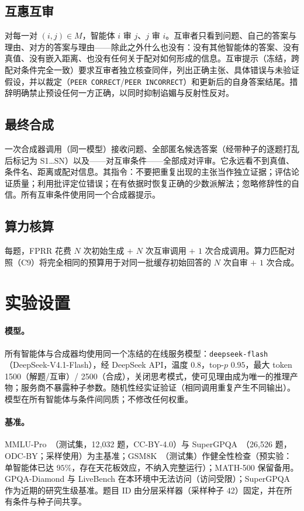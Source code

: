 \documentclass[UTF8,11pt]{ctexart}
\begin{document}
\subsection{互惠互审}
对每一对 $(i,j) \in M$，智能体 $i$ 审 $j$、$j$ 审 $i$。互审者只看到问题、自己的答案与理由、对方的答案与理由——除此之外什么也没有：没有其他智能体的答案、没有真值、没有嵌入距离、也没有任何关于配对如何形成的信息。互审提示（冻结，跨配对条件完全一致）要求互审者独立核查同伴，列出正确主张、具体错误与未验证假设，并以裁定（\texttt{PEER CORRECT}/\texttt{PEER INCORRECT}）和更新后的自身答案结尾。措辞明确禁止预设任何一方正确，以同时抑制谄媚与反射性反对。

\subsection{最终合成}
一次合成器调用（同一模型）接收问题、全部匿名候选答案（经带种子的逐题打乱后标记为 S1\dots SN）以及——对互审条件——全部成对评审。它永远看不到真值、条件名、距离或配对信息。其指令：不要把重复出现的主张当作独立证据；评估论证质量；利用批评定位错误；在有依据时恢复正确的少数派解法；忽略修辞性的自信。所有互审条件使用同一个合成器提示。

\subsection{算力核算}
每题，FPRR 花费 $N$ 次初始生成 $+$ $N$ 次互审调用 $+$ $1$ 次合成调用。算力匹配对照（C9）将完全相同的预算用于对同一批缓存初始回答的 $N$ 次自审 $+$ $1$ 次合成。

\section{实验设置}
\label{sec:setup}

\paragraph{模型。} 所有智能体与合成器均使用同一个冻结的在线服务模型：\texttt{deepseek-flash}（DeepSeek-V4.1-Flash），经 DeepSeek API，温度 $0.8$，top-$p$ $0.95$，最大 token 1500（解题/互审）/ 2500（合成），关闭思考模式，使可见理由成为唯一的推理产物；服务商不暴露种子参数。随机性经实证验证（相同调用重复产生不同输出）。模型在所有智能体与条件间同质；不修改任何权重。

\paragraph{基准。} MMLU-Pro~\cite{mmlupro}（测试集，12{,}032 题，CC-BY-4.0）与 SuperGPQA~\cite{supergpqa}（26{,}526 题，ODC-BY；采样使用）为主基准；GSM8K~\cite{gsm8k}（测试集）作健全性检查（预实验：单智能体已达 $95\%$，存在天花板效应，不纳入完整运行）；MATH-500 保留备用。GPQA-Diamond 与 LiveBench 在本环境中无法访问（访问受限）；SuperGPQA 作为近期的研究生级基准。题目 ID 由分层采样器（采样种子 42）固定，并在所有条件与种子间共享。
\end{document}
